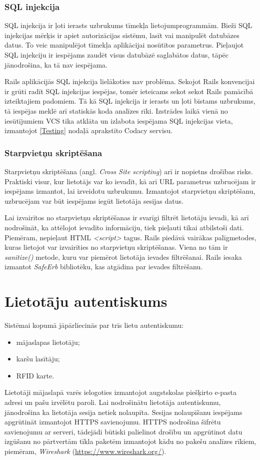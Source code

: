 \subsubsection{SQL injekcija}
SQL injekcija ir ļoti ierasts uzbrukums tīmekļa lietojumprogrammām. Bieži SQL injekcijas mērķis ir apiet autorizācijas sistēmu, lasīt vai manipulēt datubāzes datus. To veic manipulējot tīmekļa aplikācijai nosūtītos parametrus. Pieļaujot SQL injekciju ir iespējams zaudēt visus datubāzē saglabātos datus, tāpēc jānodrošina, ka tā nav iespējama.

Rails aplikācijās SQL injekcija lielākoties nav problēma. Sekojot Rails konvencijai ir grūti radīt SQL injekcijas iespējas, tomēr ieteicams sekot sekot Rails pamācībā \cite[security]{rails-guides} izteiktajiem padomiem. Tā kā SQL injekcija ir ierasts un ļoti bīstams uzbrukums, tā iespējas meklē arī statiskās koda analīzes rīki. Izstrādes laikā vienā no iesūtījumiem VCS tika atklāta un izlabota iespējama SQL injekcijas vieta, izmantojot \ref{Testing} nodaļā aprakstīto Codacy servisu.

\subsubsection{Starpvietņu skriptēšana}
Starpvietņu skriptēšana (angl. \textit{Cross Site scripting}) arī ir nopietns drošības risks. Praktiski visur, kur lietotājs var ko ievadīt, kā arī URL parametrus uzbrucējam ir iespējams izmantot, lai izveidotu uzbrukumu. Izmantojot starpvietņu skriptēšanu, uzbrucējam var būt iespējams iegūt lietotāja sesijas datus.

Lai izvairītos no starpvietņu skriptēšanas ir svarīgi filtrēt lietotāju ievadi, kā arī nodrošināt, ka attēlojot ievadīto informāciju, tiek pieļauti tikai atbilstoši dati. Piemēram, nepieļaut HTML \textit{<script>} tagus.
Rails piedāvā vairākas palīgmetodes, kuras lietojot var izvairīties no starpvietņu skriptēšanas. Viena no tām ir \textit{sanitize()} metode, kuru var piemērot lietotāja ievades filtrēšanai. Rails iesaka izmantot \textit{SafeErb} bibliotēku, kas atgādina par ievades filtrēšanu.

\section{Lietotāju autentiskums}
Sistēmai kopumā jāpārliecinās par trīs lietu autentiskumu:
\begin{itemize}
	\item mājaslapas lietotāju;
	\item karšu lasītāju;
	\item RFID karte.
\end{itemize}
Lietotāji mājaslapā varēs ielogoties izmantojot augstskolas piešķirto e-pasta adresi un pašu izvēlētu paroli. Lai nodrošinātu lietotāja autentiskumu, jānodrošina ka lietotāja sesija netiek nolaupīta. Sesijas nolaupīšanu iespējams apgrūtināt izmantojot HTTPS savienojumu. HTTPS nodrošina šifrētu savienojumu ar serveri, tādejādi būtiski palielinot drošību un apgrūtinot datu izgūšanu no pārtvertām tīkla paketēm izmantojot kādu no pakešu analīzes rīkiem, piemēram, \textit{Wireshark} (\url{https://www.wireshark.org/}).


